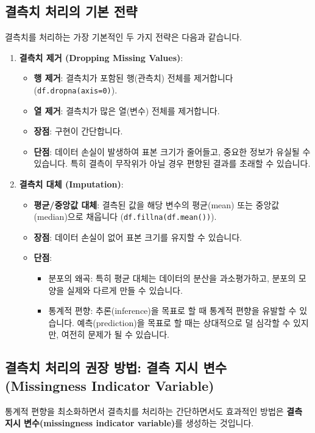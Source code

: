 \documentclass[11pt,a4paper]{book}
\theoremstyle{definition}
\begin{document}
\subsection*{결측치 처리의 기본 전략}
결측치를 처리하는 가장 기본적인 두 가지 전략은 다음과 같습니다.

\begin{enumerate}
    \item \textbf{결측치 제거 (Dropping Missing Values)}:
    \begin{itemize}
        \item \textbf{행 제거}: 결측치가 포함된 행(관측치) 전체를 제거합니다 (\texttt{df.dropna(axis=0)}).
        \item \textbf{열 제거}: 결측치가 많은 열(변수) 전체를 제거합니다.
        \item \textbf{장점}: 구현이 간단합니다.
        \item \textbf{단점}: 데이터 손실이 발생하여 표본 크기가 줄어들고, 중요한 정보가 유실될 수 있습니다. 특히 결측이 무작위가 아닐 경우 편향된 결과를 초래할 수 있습니다.
    \end{itemize}
    \item \textbf{결측치 대체 (Imputation)}:
    \begin{itemize}
        \item \textbf{평균/중앙값 대체}: 결측된 값을 해당 변수의 평균(mean) 또는 중앙값(median)으로 채웁니다 (\texttt{df.fillna(df.mean())}).
        \item \textbf{장점}: 데이터 손실이 없어 표본 크기를 유지할 수 있습니다.
        \item \textbf{단점}:
        \begin{itemize}
            \item 분포의 왜곡: 특히 평균 대체는 데이터의 분산을 과소평가하고, 분포의 모양을 실제와 다르게 만들 수 있습니다.
            \item 통계적 편향: 추론(inference)을 목표로 할 때 통계적 편향을 유발할 수 있습니다. 예측(prediction)을 목표로 할 때는 상대적으로 덜 심각할 수 있지만, 여전히 문제가 될 수 있습니다.
        \end{itemize}
    \end{itemize}
\end{enumerate}

\subsection*{결측치 처리의 권장 방법: 결측 지시 변수 (Missingness Indicator Variable)}
통계적 편향을 최소화하면서 결측치를 처리하는 간단하면서도 효과적인 방법은 \textbf{결측 지시 변수(missingness indicator variable)}를 생성하는 것입니다.
\end{document}
